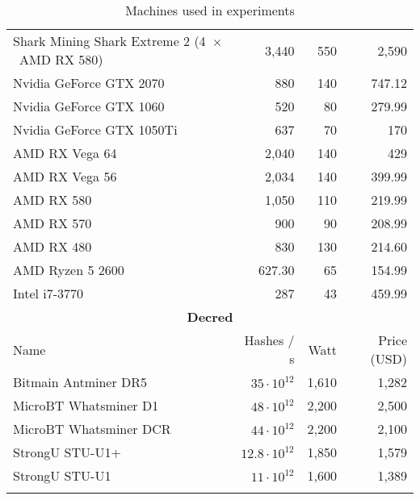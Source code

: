 \begin{longtable}{|p{}|r|r|r|}
  Shark Mining Shark Extreme 2 (4~$\times$~AMD RX 580) & 3,440 & 550 & 2,590 \\
  Nvidia GeForce GTX 2070 & 880 & 140 & 747.12 \\
  Nvidia GeForce GTX 1060 & 520 & 80 & 279.99 \\
  Nvidia GeForce GTX 1050Ti & 637 & 70 & 170 \\
  AMD RX Vega 64 & 2,040 & 140 & 429 \\
  AMD RX Vega 56 & 2,034 & 140 & 399.99 \\
  AMD RX 580 & 1,050 & 110 & 219.99 \\
  AMD RX 570 & 900 & 90 & 208.99 \\
  AMD RX 480 & 830 & 130 & 214.60 \\
  AMD Ryzen 5 2600 & 627.30 & 65 & 154.99 \\
  Intel i7-3770 & 287 & 43 & 459.99 \\
  \hline
  \multicolumn{4}{|c|}{\textbf{Decred}} \\
  \hline
  Name & Hashes / s & Watt & Price (USD)\\
  \hhline{|=|=|=|=|}
  Bitmain Antminer DR5 &   $35 \cdot 10^{12}$ & 1,610 & 1,282   \\
  MicroBT Whatsminer D1 &  $48 \cdot 10^{12}$ & 2,200 & 2,500   \\
  MicroBT Whatsminer DCR & $44 \cdot 10^{12}$ & 2,200 & 2,100   \\
  StrongU STU-U1+ &        $12.8 \cdot 10^{12}$ & 1,850 & 1,579 \\
  StrongU STU-U1 &         $11 \cdot 10^{12}$ & 1,600 & 1,389   \\
  \hline
\caption{Machines used in experiments}
\label{tbl:machines}
\end{longtable}
